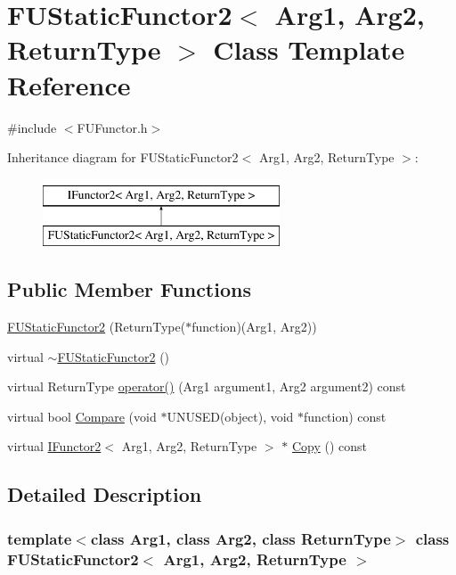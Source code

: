 \hypertarget{classFUStaticFunctor2}{
\section{FUStaticFunctor2$<$ Arg1, Arg2, ReturnType $>$ Class Template Reference}
\label{classFUStaticFunctor2}
}


{\ttfamily \#include $<$FUFunctor.h$>$}

Inheritance diagram for FUStaticFunctor2$<$ Arg1, Arg2, ReturnType $>$:\begin{figure}[H]
\begin{center}
\leavevmode
\includegraphics[height=2.000000cm]{classFUStaticFunctor2}
\end{center}
\end{figure}
\subsection*{Public Member Functions}
\begin{DoxyCompactItemize}
\item 
\hyperlink{classFUStaticFunctor2_adb36ce639cd96031681087b8fbb75857}{FUStaticFunctor2} (ReturnType($\ast$function)(Arg1, Arg2))
\item 
virtual \hyperlink{classFUStaticFunctor2_a5cfbb75fe610473fe3574f784d5793f0}{$\sim$FUStaticFunctor2} ()
\item 
virtual ReturnType \hyperlink{classFUStaticFunctor2_a8e81b2ae65b8b5afbdc8a88aa4d090ed}{operator()} (Arg1 argument1, Arg2 argument2) const 
\item 
virtual bool \hyperlink{classFUStaticFunctor2_a96c9d883005e43448a9557b55b56bb47}{Compare} (void $\ast$UNUSED(object), void $\ast$function) const 
\item 
virtual \hyperlink{classIFunctor2}{IFunctor2}$<$ Arg1, Arg2, ReturnType $>$ $\ast$ \hyperlink{classFUStaticFunctor2_a1e5af6761d3049fcf2b4e7b451c657d5}{Copy} () const 
\end{DoxyCompactItemize}


\subsection{Detailed Description}
\subsubsection*{template$<$class Arg1, class Arg2, class ReturnType$>$ class FUStaticFunctor2$<$ Arg1, Arg2, ReturnType $>$}

